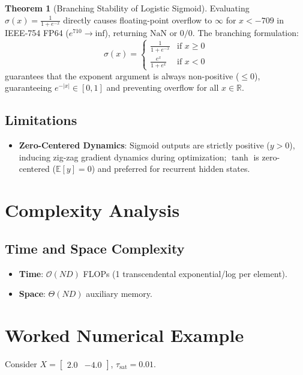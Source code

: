 \documentclass[11pt,a4paper]{article}
\theoremstyle{definition}
\newtheorem{theorem}{Theorem}[section]
\begin{document}
\begin{theorem}[Branching Stability of Logistic Sigmoid]
Evaluating $\sigma(x) = \frac{1}{1 + e^{-x}}$ directly causes floating-point overflow to $\infty$ for $x < -709$ in IEEE-754 FP64 ($e^{710} \to \text{inf}$), returning $\text{NaN}$ or $0/0$. The branching formulation:
\begin{equation}
\sigma(x) = \begin{cases} \frac{1}{1 + e^{-x}} & \text{if } x \ge 0 \\ \frac{e^x}{1 + e^x} & \text{if } x < 0 \end{cases}
\end{equation}
guarantees that the exponent argument is always non-positive ($\le 0$), guaranteeing $e^{-|x|} \in [0, 1]$ and preventing overflow for all $x \in \mathbb{R}$.
\end{theorem}

\subsection{Limitations}
\begin{itemize}
    \item \textbf{Zero-Centered Dynamics}: Sigmoid outputs are strictly positive ($y > 0$), inducing zig-zag gradient dynamics during optimization; $\tanh$ is zero-centered ($\mathbb{E}[y] = 0$) and preferred for recurrent hidden states.
\end{itemize}

\section{Complexity Analysis}

\subsection{Time and Space Complexity}
\begin{itemize}
    \item \textbf{Time}: $\mathcal{O}(ND)$ FLOPs (1 transcendental exponential/log per element).
    \item \textbf{Space}: $\Theta(ND)$ auxiliary memory.
\end{itemize}

\section{Worked Numerical Example}

Consider $X = \begin{bmatrix} 2.0 & -4.0 \end{bmatrix}$, $\tau_{\text{sat}} = 0.01$.
\end{document}

